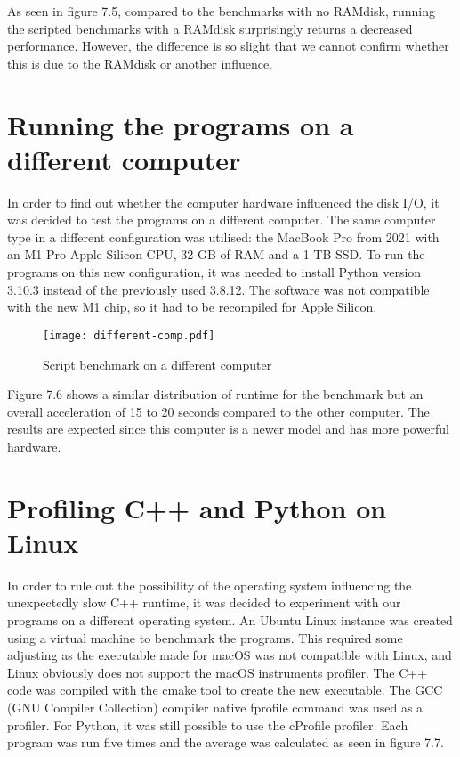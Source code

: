 As seen in figure 7.5, compared to the benchmarks with no RAMdisk, running the scripted benchmarks with a RAMdisk surprisingly returns a decreased performance. However, the difference is so slight that we cannot confirm whether this is due to the RAMdisk or another influence.

\section{Running the programs on a different computer}
In order to find out whether the computer hardware influenced the disk I/O, it was decided to test the programs on a different computer. The same computer type in a different configuration was utilised: the MacBook Pro from 2021 with an M1 Pro Apple Silicon CPU, 32 GB of RAM and a 1 TB SSD. To run the programs on this new configuration, it was needed to install Python version 3.10.3 instead of the previously used 3.8.12. The software was not compatible with the new M1 chip, so it had to be recompiled for Apple Silicon.

\begin{figure}[H]
	\centering
	\texttt{[image: different-comp.pdf]}
	\caption{Script benchmark on a different computer}
	\label{figure:different-comp}
\end{figure}

Figure 7.6 shows a similar distribution of runtime for the benchmark but an overall acceleration of 15 to 20 seconds compared to the other computer. The results are expected since this computer is a newer model and has more powerful hardware.

\section{Profiling C++ and Python on Linux}
In order to rule out the possibility of the operating system influencing the unexpectedly slow C++ runtime, it was decided to experiment with our programs on a different operating system. An Ubuntu Linux instance was created using a virtual machine to benchmark the programs. This required some adjusting as the executable made for macOS was not compatible with Linux, and Linux obviously does not support the macOS instruments profiler. The C++ code was compiled with the cmake tool \cite{cmake} to create the new executable. The GCC (GNU Compiler Collection) \cite{gcc} compiler native fprofile command was used as a profiler. For Python, it was still possible to use the cProfile profiler. Each program was run five times and the average was calculated as seen in figure 7.7.


